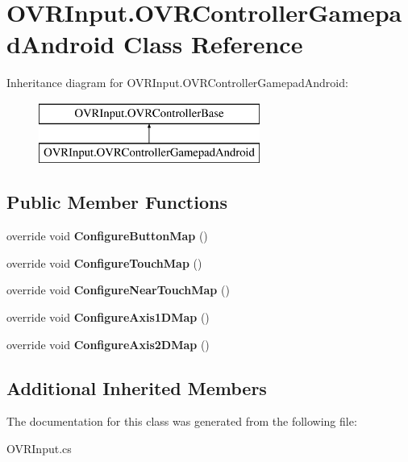 \hypertarget{class_o_v_r_input_1_1_o_v_r_controller_gamepad_android}{}\section{O\+V\+R\+Input.\+O\+V\+R\+Controller\+Gamepad\+Android Class Reference}
\label{class_o_v_r_input_1_1_o_v_r_controller_gamepad_android}
Inheritance diagram for O\+V\+R\+Input.\+O\+V\+R\+Controller\+Gamepad\+Android\+:\begin{figure}[H]
\begin{center}
\leavevmode
\includegraphics[height=2.000000cm]{class_o_v_r_input_1_1_o_v_r_controller_gamepad_android}
\end{center}
\end{figure}
\subsection*{Public Member Functions}
\begin{DoxyCompactItemize}
\item 
\mbox{\label{class_o_v_r_input_1_1_o_v_r_controller_gamepad_android_aa38b9a7c2d7442c0f3e59ab31b1a5d1c}} 
override void {\bfseries Configure\+Button\+Map} ()
\item 
\mbox{\label{class_o_v_r_input_1_1_o_v_r_controller_gamepad_android_a552a99bc639a38d88cd428c3b7c9d33a}} 
override void {\bfseries Configure\+Touch\+Map} ()
\item 
\mbox{\label{class_o_v_r_input_1_1_o_v_r_controller_gamepad_android_a0ce1f6e4683a6e04afedd8e4e7866d2c}} 
override void {\bfseries Configure\+Near\+Touch\+Map} ()
\item 
\mbox{\label{class_o_v_r_input_1_1_o_v_r_controller_gamepad_android_a7e860a4ec686a8e2e3a73748067804cc}} 
override void {\bfseries Configure\+Axis1\+D\+Map} ()
\item 
\mbox{\label{class_o_v_r_input_1_1_o_v_r_controller_gamepad_android_a0bca902f7506c48084ef62d0f2e4e1a1}} 
override void {\bfseries Configure\+Axis2\+D\+Map} ()
\end{DoxyCompactItemize}
\subsection*{Additional Inherited Members}


The documentation for this class was generated from the following file\+:\begin{DoxyCompactItemize}
\item 
O\+V\+R\+Input.\+cs\end{DoxyCompactItemize}
